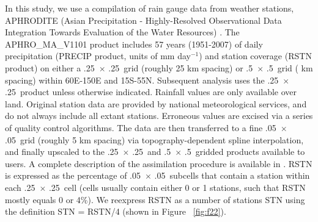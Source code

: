 	In this study, we use a compilation of rain gauge data from weather stations, APHRODITE (Asian Precipitation - Highly-Resolved Observational Data Integration Towards Evaluation of the Water Resources) \citep{Yatagai2012}. The APHRO\_MA\_V1101 product includes 57 years (1951-2007) of daily precipitation (PRECIP product, units of mm day$^{-1}$) and station coverage (RSTN product) on either a .25\textdegree\ $\times$ .25\textdegree\ grid (roughly 25 km spacing) or .5\textdegree\ $\times$ .5\textdegree\ grid ( km spacing) within 60\textdegree E-150\textdegree E and 15\textdegree S-55\textdegree N. Subsequent analysis uses the .25\textdegree\ $\times$ .25\textdegree\ product unless otherwise indicated. Rainfall values are only available over land. Original station data are provided by national meteorological services, and do not always include all extant stations. Erroneous values are excised via a series of quality control algorithms. The data are then transferred to a fine .05\textdegree\ $\times$ .05\textdegree\ grid (roughly 5 km spacing) via topography-dependent spline interpolation, and finally upscaled to the .25\textdegree\ $\times$ .25\textdegree\ and .5\textdegree\ $\times$ .5\textdegree\ gridded products available to users. A complete description of the assimilation procedure is available in  \cite{Yatagai2012}. RSTN is expressed as the percentage of .05\textdegree\ $\times$ .05\textdegree\ subcells that contain a station within each .25\textdegree\ $\times$ .25\textdegree\ cell (cells usually contain either 0 or 1 stations, such that RSTN mostly equals 0 or 4\%). We reexpress RSTN as a number of stations STN using the definition STN = RSTN/4 (shown in Figure ~\ref{fig:f22}).
	
	
